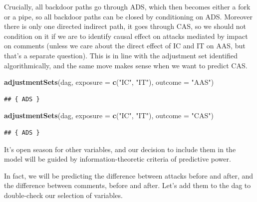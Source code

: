 \documentclass[10pt,dvipsnames,enabledeprecatedfontcommands]{scrartcl}
\newenvironment{Shaded}{\begin{snugshade}}{\end{snugshade}}
\newcommand{\KeywordTok}[1]{\textcolor[rgb]{0.13,0.29,0.53}{\textbf{#1}}}
\newcommand{\DataTypeTok}[1]{\textcolor[rgb]{0.13,0.29,0.53}{#1}}
\newcommand{\StringTok}[1]{\textcolor[rgb]{0.31,0.60,0.02}{#1}}
\newcommand{\NormalTok}[1]{#1}
\begin{document}
\normalsize

Crucially, all backdoor paths go through \textsf{ADS}, which then
becomes either a fork or a pipe, so all backdoor paths can be closed by
conditioning on \textsf{ADS}. Moreover there is only one directed
indirect path, it goes through \textsf{CAS}, so we should not condition
on it if we are to identify causal effect on attacks mediated by impact
on comments (unless we care about the direct effect of \textsf{IC} and
\textsf{IT} on \textsf{AAS}, but that's a separate question). This is in
line with the adjustment set identified algorithmically, and the same
move makes sense when we want to predict \textsf{CAS}.

\vspace{1mm} \footnotesize

\begin{Shaded}
\begin{Highlighting}[]
\KeywordTok{adjustmentSets}\NormalTok{(dag, }\DataTypeTok{exposure =} \KeywordTok{c}\NormalTok{(}\StringTok{"IC"}\NormalTok{, }\StringTok{"IT"}\NormalTok{), }\DataTypeTok{outcome =} \StringTok{"AAS"}\NormalTok{)}
\end{Highlighting}
\end{Shaded}

\begin{verbatim}
## { ADS }
\end{verbatim}

\begin{Shaded}
\begin{Highlighting}[]
\KeywordTok{adjustmentSets}\NormalTok{(dag, }\DataTypeTok{exposure =} \KeywordTok{c}\NormalTok{(}\StringTok{"IC"}\NormalTok{, }\StringTok{"IT"}\NormalTok{), }\DataTypeTok{outcome =} \StringTok{"CAS"}\NormalTok{)}
\end{Highlighting}
\end{Shaded}

\begin{verbatim}
## { ADS }
\end{verbatim}

\normalsize

It's open season for other variables, and our decision to include them
in the model will be guided by information-theoretic criteria of
predictive power.

In fact, we will be predicting the difference between attacks before and
after, and the difference between comments, before and after. Let's add
them to the dag to double-check our selection of variables.
\end{document}
